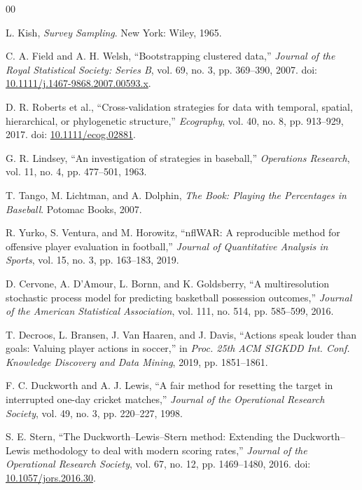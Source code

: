 \documentclass[conference]{IEEEtran}
\begin{document}
\begin{thebibliography}{00}

 L. Kish, \emph{Survey Sampling}. New York: Wiley, 1965.

 C. A. Field and A. H. Welsh, ``Bootstrapping
clustered data,'' \emph{Journal of the Royal Statistical Society:
Series B}, vol. 69, no. 3, pp. 369--390, 2007. doi: \href{https://doi.org/10.1111/j.1467-9868.2007.00593.x}{10.1111/j.1467-9868.2007.00593.x}.

 D. R. Roberts et al., ``Cross-validation
strategies for data with temporal, spatial, hierarchical, or
phylogenetic structure,'' \emph{Ecography}, vol. 40, no. 8,
pp. 913--929, 2017. doi: \href{https://doi.org/10.1111/ecog.02881}{10.1111/ecog.02881}.

 G. R. Lindsey, ``An investigation of strategies in
baseball,'' \emph{Operations Research}, vol. 11, no. 4, pp. 477--501, 1963.

 T. Tango, M. Lichtman, and A. Dolphin, \emph{The
Book: Playing the Percentages in Baseball}. Potomac Books, 2007.

 R. Yurko, S. Ventura, and M. Horowitz, ``nflWAR: A
reproducible method for offensive player evaluation in football,''
\emph{Journal of Quantitative Analysis in Sports}, vol. 15, no. 3,
pp. 163--183, 2019.

 D. Cervone, A. D'Amour, L. Bornn, and K. Goldsberry,
``A multiresolution stochastic process model for predicting basketball
possession outcomes,'' \emph{Journal of the American Statistical
Association}, vol. 111, no. 514, pp. 585--599, 2016.

 T. Decroos, L. Bransen, J. Van Haaren, and
J. Davis, ``Actions speak louder than goals: Valuing player actions in
soccer,'' in \emph{Proc. 25th ACM SIGKDD Int. Conf. Knowledge Discovery
and Data Mining}, 2019, pp. 1851--1861.

 F. C. Duckworth and A. J. Lewis, ``A fair method for
resetting the target in interrupted one-day cricket matches,''
\emph{Journal of the Operational Research Society}, vol. 49, no. 3,
pp. 220--227, 1998.

 S. E. Stern, ``The Duckworth--Lewis--Stern method:
Extending the Duckworth--Lewis methodology to deal with modern scoring
rates,'' \emph{Journal of the Operational Research Society}, vol. 67,
no. 12, pp. 1469--1480, 2016. doi: \href{https://doi.org/10.1057/jors.2016.30}{10.1057/jors.2016.30}.


\end{thebibliography}
\end{document}
